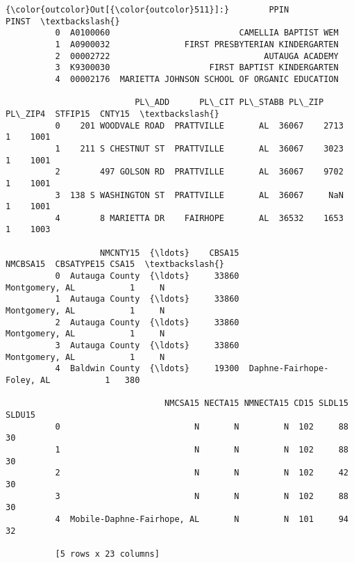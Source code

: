 \documentclass[11pt]{article}
\begin{document}
\begin{Verbatim}[commandchars=\\\{\}]
{\color{outcolor}Out[{\color{outcolor}511}]:}        PPIN                                         PINST  \textbackslash{}
          0  A0100060                          CAMELLIA BAPTIST WEM   
          1  A0900032               FIRST PRESBYTERIAN KINDERGARTEN   
          2  00002722                               AUTAUGA ACADEMY   
          3  K9300030                    FIRST BAPTIST KINDERGARTEN   
          4  00002176  MARIETTA JOHNSON SCHOOL OF ORGANIC EDUCATION   
          
                          PL\_ADD      PL\_CIT PL\_STABB PL\_ZIP PL\_ZIP4  STFIP15  CNTY15  \textbackslash{}
          0    201 WOODVALE ROAD  PRATTVILLE       AL  36067    2713        1    1001   
          1    211 S CHESTNUT ST  PRATTVILLE       AL  36067    3023        1    1001   
          2        497 GOLSON RD  PRATTVILLE       AL  36067    9702        1    1001   
          3  138 S WASHINGTON ST  PRATTVILLE       AL  36067     NaN        1    1001   
          4        8 MARIETTA DR    FAIRHOPE       AL  36532    1653        1    1003   
          
                   NMCNTY15  {\ldots}    CBSA15                   NMCBSA15  CBSATYPE15 CSA15  \textbackslash{}
          0  Autauga County  {\ldots}     33860             Montgomery, AL           1     N   
          1  Autauga County  {\ldots}     33860             Montgomery, AL           1     N   
          2  Autauga County  {\ldots}     33860             Montgomery, AL           1     N   
          3  Autauga County  {\ldots}     33860             Montgomery, AL           1     N   
          4  Baldwin County  {\ldots}     19300  Daphne-Fairhope-Foley, AL           1   380   
          
                                NMCSA15 NECTA15 NMNECTA15 CD15 SLDL15 SLDU15  
          0                           N       N         N  102     88     30  
          1                           N       N         N  102     88     30  
          2                           N       N         N  102     42     30  
          3                           N       N         N  102     88     30  
          4  Mobile-Daphne-Fairhope, AL       N         N  101     94     32  
          
          [5 rows x 23 columns]
\end{Verbatim}
            
\end{document}
